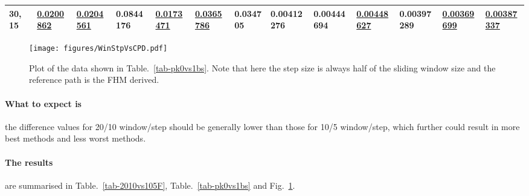 \begin{table*}
{\begin{tabular}{|l|l|l|l|l|l|l|l|l|l|l|l|l|}
30, 15 & {\color[HTML]{009901} {\ul \textbf{0.0200862}}} & {\color[HTML]{009901} {\ul \textbf{0.0204561}}} & 0.0844176 & {\color[HTML]{009901} {\ul \textbf{0.0173471}}} & {\color[HTML]{009901} {\ul \textbf{0.0365786}}} & 0.034705 & {\color[HTML]{32CB00} \textbf{0.00412276}} & {\color[HTML]{34FF34} \textbf{0.00444694}} & {\color[HTML]{009901} {\ul \textbf{0.00448627}}} & {\color[HTML]{32CB00} \textbf{0.00397289}} & {\color[HTML]{009901} {\ul \textbf{0.00369699}}} & {\color[HTML]{009901} {\ul \textbf{0.00387337}}} \\ \hline
\end{tabular}%
}
\end{table*}

\begin{figure}
\centering
\texttt{[image: figures/WinStpVsCPD.pdf]}
\caption[Sliding window and step sizes versus CPD]{Plot of the data shown in
  Table.~\ref{tab-pk0vs1bs}. Note that here the step size is always half of the
  sliding window size and the reference path is the FHM derived.}\label{fig-WinStpVsCPD}
\end{figure}

\paragraph{What to expect is}
the difference values for 20/10 window/step should be generally lower than those
for 10/5 window/step, which further could result in more best methods and less
worst methods.

\paragraph{The results}
are summarised in Table.~\ref{tab-2010vs105F}, Table.~\ref{tab-pk0vs1bs} and
Fig.~\ref{fig-WinStpVsCPD}.

